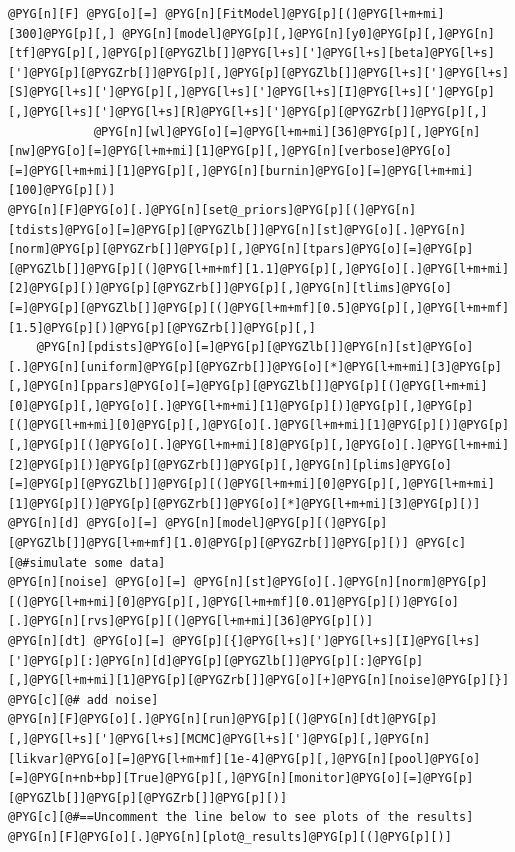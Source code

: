 \documentclass[a4paper,10pt,english]{manual}
\begin{document}
\begin{Verbatim}[commandchars=@\[\]]
@PYG[n][F] @PYG[o][=] @PYG[n][FitModel]@PYG[p][(]@PYG[l+m+mi][300]@PYG[p][,] @PYG[n][model]@PYG[p][,]@PYG[n][y0]@PYG[p][,]@PYG[n][tf]@PYG[p][,]@PYG[p][@PYGZlb[]]@PYG[l+s][']@PYG[l+s][beta]@PYG[l+s][']@PYG[p][@PYGZrb[]]@PYG[p][,]@PYG[p][@PYGZlb[]]@PYG[l+s][']@PYG[l+s][S]@PYG[l+s][']@PYG[p][,]@PYG[l+s][']@PYG[l+s][I]@PYG[l+s][']@PYG[p][,]@PYG[l+s][']@PYG[l+s][R]@PYG[l+s][']@PYG[p][@PYGZrb[]]@PYG[p][,]
            @PYG[n][wl]@PYG[o][=]@PYG[l+m+mi][36]@PYG[p][,]@PYG[n][nw]@PYG[o][=]@PYG[l+m+mi][1]@PYG[p][,]@PYG[n][verbose]@PYG[o][=]@PYG[l+m+mi][1]@PYG[p][,]@PYG[n][burnin]@PYG[o][=]@PYG[l+m+mi][100]@PYG[p][)]
@PYG[n][F]@PYG[o][.]@PYG[n][set@_priors]@PYG[p][(]@PYG[n][tdists]@PYG[o][=]@PYG[p][@PYGZlb[]]@PYG[n][st]@PYG[o][.]@PYG[n][norm]@PYG[p][@PYGZrb[]]@PYG[p][,]@PYG[n][tpars]@PYG[o][=]@PYG[p][@PYGZlb[]]@PYG[p][(]@PYG[l+m+mf][1.1]@PYG[p][,]@PYG[o][.]@PYG[l+m+mi][2]@PYG[p][)]@PYG[p][@PYGZrb[]]@PYG[p][,]@PYG[n][tlims]@PYG[o][=]@PYG[p][@PYGZlb[]]@PYG[p][(]@PYG[l+m+mf][0.5]@PYG[p][,]@PYG[l+m+mf][1.5]@PYG[p][)]@PYG[p][@PYGZrb[]]@PYG[p][,]
    @PYG[n][pdists]@PYG[o][=]@PYG[p][@PYGZlb[]]@PYG[n][st]@PYG[o][.]@PYG[n][uniform]@PYG[p][@PYGZrb[]]@PYG[o][*]@PYG[l+m+mi][3]@PYG[p][,]@PYG[n][ppars]@PYG[o][=]@PYG[p][@PYGZlb[]]@PYG[p][(]@PYG[l+m+mi][0]@PYG[p][,]@PYG[o][.]@PYG[l+m+mi][1]@PYG[p][)]@PYG[p][,]@PYG[p][(]@PYG[l+m+mi][0]@PYG[p][,]@PYG[o][.]@PYG[l+m+mi][1]@PYG[p][)]@PYG[p][,]@PYG[p][(]@PYG[o][.]@PYG[l+m+mi][8]@PYG[p][,]@PYG[o][.]@PYG[l+m+mi][2]@PYG[p][)]@PYG[p][@PYGZrb[]]@PYG[p][,]@PYG[n][plims]@PYG[o][=]@PYG[p][@PYGZlb[]]@PYG[p][(]@PYG[l+m+mi][0]@PYG[p][,]@PYG[l+m+mi][1]@PYG[p][)]@PYG[p][@PYGZrb[]]@PYG[o][*]@PYG[l+m+mi][3]@PYG[p][)]
@PYG[n][d] @PYG[o][=] @PYG[n][model]@PYG[p][(]@PYG[p][@PYGZlb[]]@PYG[l+m+mf][1.0]@PYG[p][@PYGZrb[]]@PYG[p][)] @PYG[c][@#simulate some data]
@PYG[n][noise] @PYG[o][=] @PYG[n][st]@PYG[o][.]@PYG[n][norm]@PYG[p][(]@PYG[l+m+mi][0]@PYG[p][,]@PYG[l+m+mf][0.01]@PYG[p][)]@PYG[o][.]@PYG[n][rvs]@PYG[p][(]@PYG[l+m+mi][36]@PYG[p][)]
@PYG[n][dt] @PYG[o][=] @PYG[p][{]@PYG[l+s][']@PYG[l+s][I]@PYG[l+s][']@PYG[p][:]@PYG[n][d]@PYG[p][@PYGZlb[]]@PYG[p][:]@PYG[p][,]@PYG[l+m+mi][1]@PYG[p][@PYGZrb[]]@PYG[o][+]@PYG[n][noise]@PYG[p][}] @PYG[c][@# add noise]
@PYG[n][F]@PYG[o][.]@PYG[n][run]@PYG[p][(]@PYG[n][dt]@PYG[p][,]@PYG[l+s][']@PYG[l+s][MCMC]@PYG[l+s][']@PYG[p][,]@PYG[n][likvar]@PYG[o][=]@PYG[l+m+mf][1e-4]@PYG[p][,]@PYG[n][pool]@PYG[o][=]@PYG[n+nb+bp][True]@PYG[p][,]@PYG[n][monitor]@PYG[o][=]@PYG[p][@PYGZlb[]]@PYG[p][@PYGZrb[]]@PYG[p][)]
@PYG[c][@#==Uncomment the line below to see plots of the results]
@PYG[n][F]@PYG[o][.]@PYG[n][plot@_results]@PYG[p][(]@PYG[p][)]
\end{Verbatim}
\end{document}
